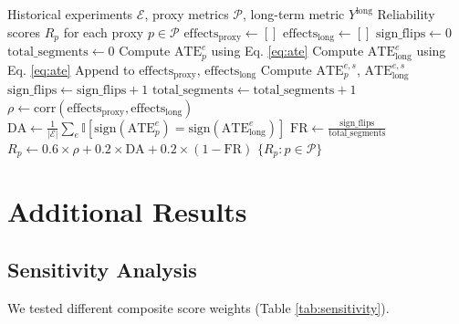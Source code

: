 \documentclass[11pt,twocolumn]{article}
\begin{document}
\begin{algorithm}
\caption{PROXIMA Composite Scoring}
\label{alg:proxima}
\begin{algorithmic}[1]
\REQUIRE Historical experiments $\mathcal{E}$, proxy metrics $\mathcal{P}$, long-term metric $Y^{\text{long}}$
\ENSURE Reliability scores $R_p$ for each proxy $p \in \mathcal{P}$
    \STATE $\text{effects}_{\text{proxy}} \gets []$
    \STATE $\text{effects}_{\text{long}} \gets []$
    \STATE $\text{sign\_flips} \gets 0$
    \STATE $\text{total\_segments} \gets 0$
        \STATE Compute $\text{ATE}_p^e$ using Eq. \ref{eq:ate}
        \STATE Compute $\text{ATE}_{\text{long}}^e$ using Eq. \ref{eq:ate}
        \STATE Append to $\text{effects}_{\text{proxy}}$, $\text{effects}_{\text{long}}$
            \STATE Compute $\text{ATE}_p^{e,s}$, $\text{ATE}_{\text{long}}^{e,s}$
                \STATE $\text{sign\_flips} \gets \text{sign\_flips} + 1$
            \ENDIF
            \STATE $\text{total\_segments} \gets \text{total\_segments} + 1$
        \ENDFOR
    \ENDFOR
    \STATE $\rho \gets \text{corr}(\text{effects}_{\text{proxy}}, \text{effects}_{\text{long}})$
    \STATE $\text{DA} \gets \frac{1}{|\mathcal{E}|} \sum_{e} \mathbb{I}[\text{sign}(\text{ATE}_p^e) = \text{sign}(\text{ATE}_{\text{long}}^e)]$
    \STATE $\text{FR} \gets \frac{\text{sign\_flips}}{\text{total\_segments}}$
    \STATE $R_p \gets 0.6 \times \rho + 0.2 \times \text{DA} + 0.2 \times (1 - \text{FR})$ 
\ENDFOR
\RETURN $\{R_p : p \in \mathcal{P}\}$
\end{algorithmic}
\end{algorithm}

\section{Additional Results}

\subsection{Sensitivity Analysis}

We tested different composite score weights (Table \ref{tab:sensitivity}).
\end{document}
